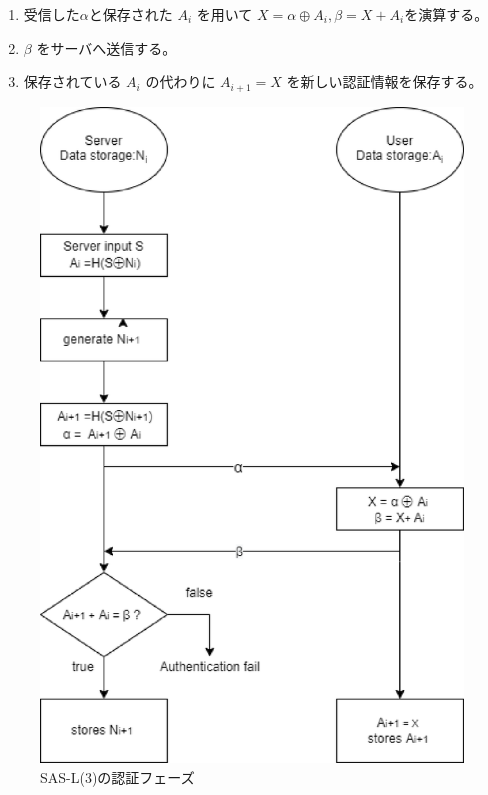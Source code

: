 \documentclass{thesis}
\begin{document}
\begin{enumerate}[1.]
				\item 受信した$\alpha$と保存された $A_i$ を用いて $X = \alpha \oplus A_i ,\beta =X+A_i$を演算する。
				\item $\beta$ をサーバへ送信する。
				\item 保存されている $A_i$ の代わりに $A_{i+1}=X$ を新しい認証情報を保存する。
\end{enumerate}
%
\begin{figure}[H]
 \center
 \includegraphics[scale=0.75]{./image/sasl3i2.eps}
 \caption{SAS-L(3)の認証フェーズ}
 \label{3i}
\end{figure}
%
\end{document}
